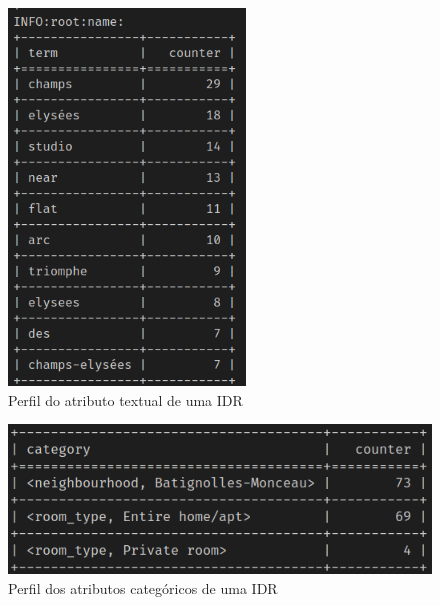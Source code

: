 \begin{figure}[t]
	\centering
	\includegraphics[height=10cm,keepaspectratio]{imagens/perfil-textuais}
	\caption{Perfil do atributo textual de uma IDR}
	\label{fig:perfil-textuais}
	\vspace{-10pt}
\end{figure}

\begin{figure}[t]
	\centering
	\includegraphics[width=\columnwidth]{imagens/perfil-categoricos}
	\caption{Perfil dos atributos categóricos de uma IDR}
	\label{fig:perfil-categoricos}
	\vspace{-10pt}
\end{figure}

